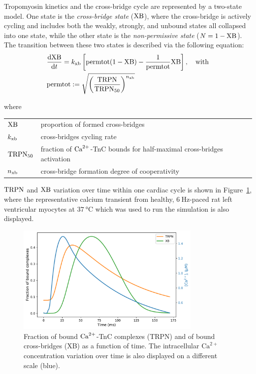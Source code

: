 \vspace{0.2cm}
Tropomyosin kinetics and the cross-bridge cycle are represented by a two-state model. One state is the \textit{cross-bridge state} ($\textrm{XB}$), where the cross-bridge is actively cycling and includes both the weakly, strongly, and unbound states all collapsed into one state, while the other state is the \textit{non-permissive state} ($N=1-\textrm{XB}$). The transition between these two states is described via the following equation:
%
\begin{align}\label{eq:landodesys2}
    & \dfrac{\mathrm{d}{\textrm{XB}}}{\mathrm{d}{t}} = k_{\textrm{xb}}\left[\textrm{permtot}(1-\textrm{XB})-\frac{1}{\textrm{permtot}}\textrm{XB}\right],\quad\text{with} \\
    & \textrm{permtot} := \sqrt{\left(\frac{\textrm{TRPN}}{\textrm{TRPN}_{50}}\right)^{n_{\textrm{xb}}}} \nonumber
\end{align}

\noindent
where

\vspace{0.2cm}
\begin{tabular}{ll}
    $\textrm{XB}$    & proportion of formed cross-bridges \\
    $k_{\textrm{xb}}$   & cross-bridges cycling rate \\
    $\textrm{TRPN}_{50}$ & fraction of $\textrm{Ca}^{2+}$-TnC bounds for half-maximal cross-bridges activation \\
    $n_{\textrm{xb}}$   & cross-bridge formation degree of cooperativity
\end{tabular}

\vspace{0.2cm}\noindent
$\textrm{TRPN}$ and $\textrm{XB}$ variation over time within one cardiac cycle is shown in Figure~\ref{fig:catrpnxb}, where the representative calcium
transient from healthy, $\SI{6}{\hertz}$-paced rat left ventricular myocytes at $\SI{37}{\celsius}$ which was used to run the simulation is also displayed.

\begin{figure}[ht!]
    \myfloatalign
    \includegraphics[width=0.8\textwidth]{figures/chapter02/Ca_TRPN_XB.pdf}
    \caption{Fraction of bound $\textrm{Ca}^{2+}$-TnC complexes (TRPN) and of bound cross-bridges (XB) as a function of time. The intracellular $\textrm{Ca}^{2+}$ concentration variation over time is also displayed on a different scale (blue).}
    \label{fig:catrpnxb}
\end{figure}

